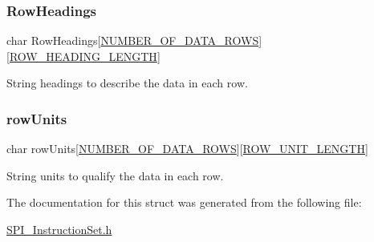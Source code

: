 \subsubsection{\texorpdfstring{RowHeadings}{RowHeadings}}
{\footnotesize\ttfamily char Row\+Headings\mbox{[}\mbox{\hyperlink{_s_p_i___instruction_set_8h_a030a0b94acdc35db8cf20a5044a1c775}{N\+U\+M\+B\+E\+R\+\_\+\+O\+F\+\_\+\+D\+A\+T\+A\+\_\+\+R\+O\+WS}}\mbox{]}\mbox{[}\mbox{\hyperlink{_s_p_i___instruction_set_8h_a63a97a0fe356d1b3030dfb633e0d0b8e}{R\+O\+W\+\_\+\+H\+E\+A\+D\+I\+N\+G\+\_\+\+L\+E\+N\+G\+TH}}\mbox{]}}



String headings to describe the data in each row. 

\mbox{\label{struct_data_a004891d89fb41172310a55947f922a54}} 
\subsubsection{\texorpdfstring{rowUnits}{rowUnits}}
{\footnotesize\ttfamily char row\+Units\mbox{[}\mbox{\hyperlink{_s_p_i___instruction_set_8h_a030a0b94acdc35db8cf20a5044a1c775}{N\+U\+M\+B\+E\+R\+\_\+\+O\+F\+\_\+\+D\+A\+T\+A\+\_\+\+R\+O\+WS}}\mbox{]}\mbox{[}\mbox{\hyperlink{_s_p_i___instruction_set_8h_af45194e4246701e52a2d67f27cc3ffb8}{R\+O\+W\+\_\+\+U\+N\+I\+T\+\_\+\+L\+E\+N\+G\+TH}}\mbox{]}}



String units to qualify the data in each row. 



The documentation for this struct was generated from the following file\+:\begin{DoxyCompactItemize}
\item 
\mbox{\hyperlink{_s_p_i___instruction_set_8h}{S\+P\+I\+\_\+\+Instruction\+Set.\+h}}\end{DoxyCompactItemize}
